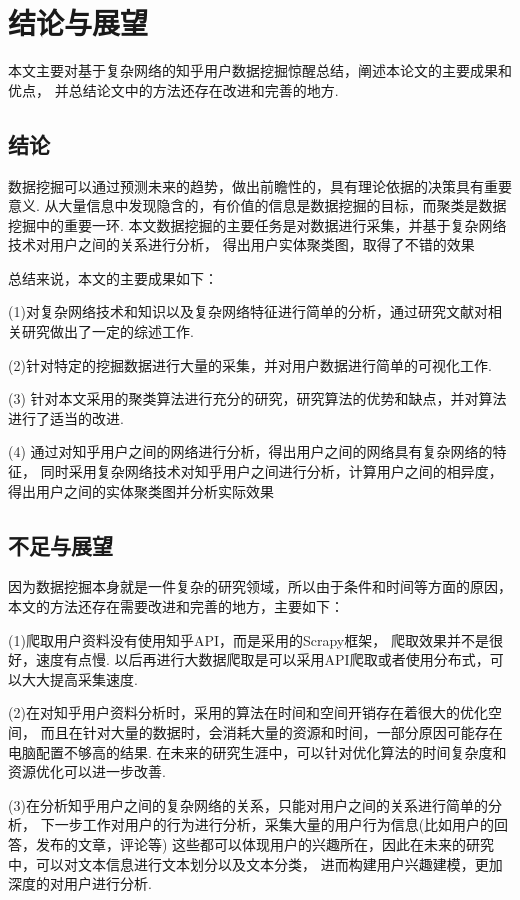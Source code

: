 \documentclass[bachelor,adobefonts]{jnuthesis}
\begin{document}
\chapter{结论与展望}
本文主要对基于复杂网络的知乎用户数据挖掘惊醒总结，阐述本论文的主要成果和优点，
并总结论文中的方法还存在改进和完善的地方.

\section{结论}

数据挖掘可以通过预测未来的趋势，做出前瞻性的，具有理论依据的决策具有重要意义.
从大量信息中发现隐含的，有价值的信息是数据挖掘的目标，而聚类是数据挖掘中的重要一环.
本文数据挖掘的主要任务是对数据进行采集，并基于复杂网络技术对用户之间的关系进行分析，
得出用户实体聚类图，取得了不错的效果

总结来说，本文的主要成果如下：

(1)对复杂网络技术和知识以及复杂网络特征进行简单的分析，通过研究文献对相关研究做出了一定的综述工作.

(2)针对特定的挖掘数据进行大量的采集，并对用户数据进行简单的可视化工作.

(3) 针对本文采用的聚类算法进行充分的研究，研究算法的优势和缺点，并对算法进行了适当的改进.

(4) 通过对知乎用户之间的网络进行分析，得出用户之间的网络具有复杂网络的特征，
同时采用复杂网络技术对知乎用户之间进行分析，计算用户之间的相异度，
得出用户之间的实体聚类图并分析实际效果

\section{不足与展望}
因为数据挖掘本身就是一件复杂的研究领域，所以由于条件和时间等方面的原因，
本文的方法还存在需要改进和完善的地方，主要如下：

(1)爬取用户资料没有使用知乎API，而是采用的Scrapy框架，
爬取效果并不是很好，速度有点慢.
以后再进行大数据爬取是可以采用API爬取或者使用分布式，可以大大提高采集速度.

(2)在对知乎用户资料分析时，采用的算法在时间和空间开销存在着很大的优化空间，
而且在针对大量的数据时，会消耗大量的资源和时间，一部分原因可能存在电脑配置不够高的结果.
在未来的研究生涯中，可以针对优化算法的时间复杂度和资源优化可以进一步改善.

(3)在分析知乎用户之间的复杂网络的关系，只能对用户之间的关系进行简单的分析，
下一步工作对用户的行为进行分析，采集大量的用户行为信息(比如用户的回答，发布的文章，评论等)
这些都可以体现用户的兴趣所在，因此在未来的研究中，可以对文本信息进行文本划分以及文本分类，
进而构建用户兴趣建模，更加深度的对用户进行分析.
\end{document}
